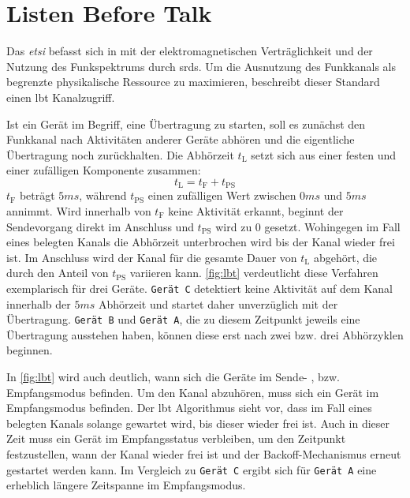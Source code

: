 \section{Listen Before Talk}
Das \emph{\ac{etsi}} befasst sich in \citep{lbt} mit der elektromagnetischen Verträglichkeit und der Nutzung des Funkspektrums durch \acp{srd}. Um die Ausnutzung des Funkkanals als begrenzte physikalische Ressource zu maximieren, beschreibt dieser Standard einen \ac{lbt} Kanalzugriff. 

Ist ein Gerät im Begriff, eine Übertragung zu starten, soll es zunächst den Funkkanal nach Aktivitäten anderer Geräte abhören und die eigentliche Übertragung noch zurückhalten. Die Abhörzeit $t_{\textrm{L}}$ setzt sich aus einer festen und einer zufälligen Komponente zusammen:
\begin{equation}
{t_{\textrm{L}}} = {t_{\textrm{F}}} + {t_{\textrm{PS}}}
\end{equation}
${t_{\textrm{F}}}$ beträgt $5ms$, während ${t_{\textrm{PS}}}$ einen zufälligen Wert zwischen $0ms$ und $5ms$ annimmt. Wird innerhalb von ${t_{\textrm{F}}}$ keine Aktivität erkannt, beginnt der Sendevorgang direkt im Anschluss und ${t_{\textrm{PS}}}$ wird zu $0$ gesetzt. Wohingegen im Fall eines belegten Kanals die Abhörzeit unterbrochen wird bis der Kanal wieder frei ist. Im Anschluss wird der Kanal für die gesamte Dauer von ${t_{\textrm{L}}}$ abgehört, die durch den Anteil von ${t_{\textrm{PS}}}$ variieren kann. \autoref{fig:lbt} verdeutlicht diese Verfahren exemplarisch für drei Geräte. \texttt{Gerät C} detektiert keine Aktivität auf dem Kanal innerhalb der $5ms$ Abhörzeit und startet daher unverzüglich mit der Übertragung. \texttt{Gerät B} und \texttt{Gerät A}, die zu diesem Zeitpunkt jeweils eine Übertragung ausstehen haben, können diese erst nach zwei bzw. drei Abhörzyklen beginnen.

In \autoref{fig:lbt} wird auch deutlich, wann sich die Geräte im Sende- , bzw. Empfangsmodus befinden. Um den Kanal abzuhören, muss sich ein Gerät im Empfangsmodus befinden. Der \ac{lbt} Algorithmus sieht vor, dass im Fall eines belegten Kanals solange gewartet wird, bis dieser wieder frei ist. Auch in dieser Zeit muss ein Gerät im Empfangsstatus verbleiben, um den Zeitpunkt festzustellen, wann der Kanal wieder frei ist und der Backoff-Mechanismus erneut gestartet werden kann. Im Vergleich zu \texttt{Gerät C} ergibt sich für \texttt{Gerät A} eine erheblich längere Zeitspanne im Empfangsmodus.

